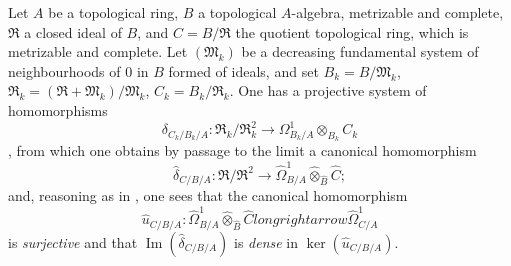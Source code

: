 \begin{env}[20.7.20]
\label{0.20.7.20}
Let $A$ be a topological ring, $B$ a topological $A$-algebra, metrizable and complete, $\mathfrak{R}$ a closed ideal of $B$, and $C=B/\mathfrak{R}$ the quotient topological ring, which is metrizable and complete. Let $(\mathfrak{M}_k)$ be a decreasing fundamental system of neighbourhoods of $0$ in $B$ formed of ideals, and set $B_k=B/\mathfrak{M}_k$, $\mathfrak{R}_k=(\mathfrak{R}+\mathfrak{M}_k)/\mathfrak{M}_k$, $C_k=B_k/\mathfrak{R}_k$. One has a projective system of homomorphisms
\[
  \delta_{C_k/B_k/A}:\mathfrak{R}_k/\mathfrak{R}_k^2\longrightarrow\Omega^1_{B_k/A}\otimes_{B_k}C_k
\]
, from which one obtains by passage to the limit a canonical homomorphism
\[
  \widehat{\delta}_{C/B/A}:\mathfrak{R}/\mathfrak{R}^2\longrightarrow
  \widehat{\Omega}^1_{B/A}\widehat{\otimes}_{\widehat{B}}\widehat{C};
\]
and, reasoning as in , one sees that the canonical homomorphism
\[
  \widehat{u}_{C/B/A}:\widehat{\Omega}^1_{B/A}\widehat{\otimes}_{\widehat{B}}\widehat{C}longrightarrow\widehat{\Omega}^1_{C/A}
\]
is \emph{surjective} and that $\operatorname{Im}(\widehat{\delta}_{C/B/A})$ is \emph{dense} in $\ker(\widehat{u}_{C/B/A})$.
\end{env}
